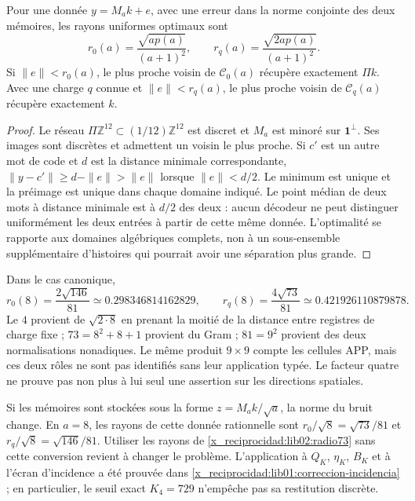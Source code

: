 \begin{theorem}
\label{x_reciprocidad:lib02:radios-memoria}
Pour une donnée \(y=M_ak+e\), avec une erreur dans la norme conjointe des deux mémoires, les rayons uniformes optimaux sont
\begin{equation}
 r_0(a)=\frac{\sqrt{ap(a)}}{(a+1)^2},\qquad
 r_q(a)=\frac{\sqrt{2ap(a)}}{(a+1)^2}.
 \label{x_reciprocidad:lib02:radios}
\end{equation}
Si \(\|e\|<r_0(a)\), le plus proche voisin de \(\mathcal C_0(a)\) récupère exactement \(\Pi k\). Avec une charge \(q\) connue et \(\|e\|<r_q(a)\), le plus proche voisin de \(\mathcal C_q(a)\) récupère exactement \(k\).
\end{theorem}
\begin{proof}
Le réseau \(\Pi\mathbb Z^{12}\subset(1/12)\mathbb Z^{12}\) est
discret et \(M_a\) est minoré sur
\(\mathbf1^\perp\). Ses images sont discrètes et admettent un voisin
le plus proche. Si \(c'\) est un autre mot de code et \(d\) est la
distance minimale correspondante,
\(\|y-c'\|\geq d-\|e\|>\|e\|\) lorsque \(\|e\|<d/2\).
Le minimum est unique et la préimage est unique dans chaque domaine indiqué.
Le point médian de deux mots à distance minimale est à \(d/2\)
des deux : aucun décodeur ne peut distinguer uniformément les deux
entrées à partir de cette même donnée. L’optimalité se rapporte aux domaines
algébriques complets, non à un sous-ensemble supplémentaire d’histoires qui
pourrait avoir une séparation plus grande.
\end{proof}

Dans le cas canonique,
\begin{equation}
 r_0(8)=\frac{2\sqrt{146}}{81}\simeq0.298346814162829,
 \qquad
 r_q(8)=\frac{4\sqrt{73}}{81}\simeq0.421926110879878.
 \label{x_reciprocidad:lib02:radio73}
\end{equation}
Le \(4\) provient de \(\sqrt{2\cdot8}\) en prenant la moitié de la
distance entre registres de charge fixe ; \(73=8^2+8+1\) provient du
Gram ; \(81=9^2\) provient des deux normalisations nonadiques. Le même
produit \(9\times9\) compte les cellules APP, mais ces deux rôles
ne sont pas identifiés sans leur application typée. Le facteur quatre ne
prouve pas non plus à lui seul une assertion sur les directions spatiales.

Si les mémoires sont stockées sous la forme \(z=M_ak/\sqrt a\), la norme du bruit change. En \(a=8\), les rayons de cette donnée rationnelle sont \(r_0/\sqrt8=\sqrt{73}/81\) et \(r_q/\sqrt8=\sqrt{146}/81\). Utiliser les rayons de \eqref{x_reciprocidad:lib02:radio73} sans cette conversion revient à changer le problème. L'application à \(Q_K\), \(\eta_K\), \(B_K\) et à l'écran d'incidence a été prouvée dans \cref{x_reciprocidad:lib01:correccion-incidencia} ; en particulier, le seuil exact \(K_4=729\) n'empêche pas sa restitution discrète.

